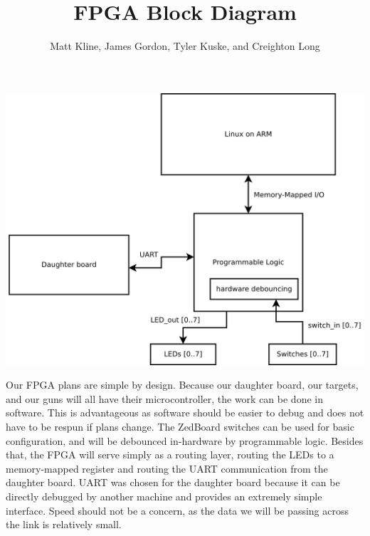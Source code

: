 \documentclass{article}
\title{FPGA Block Diagram}
\author{Matt Kline, James Gordon, Tyler Kuske, and Creighton Long}
\begin{document}
\maketitle

\begin{center}
\includegraphics[height=0.4\textheight, keepaspectratio]{fpga_block.png}
\end{center}

\vspace{2cm}

Our FPGA plans are simple by design. Because our daughter board, our targets,
and our guns will all have their microcontroller, the work can be done in software.
This is advantageous as software should be easier to debug and does not have to be respun if plans change.
The ZedBoard switches can be used for basic configuration, and will be debounced in-hardware by programmable logic.
Besides that, the FPGA will serve simply as a routing layer, routing the LEDs to a memory-mapped register
and routing the UART communication from the daughter board.
UART was chosen for the daughter board because it can be directly debugged by another machine and provides
an extremely simple interface.
Speed should not be a concern, as the data we will be passing across the link is relatively small.
\end{document}
